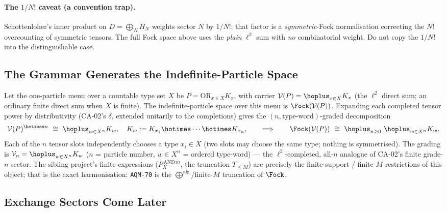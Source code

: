 \paragraph{The $1/N!$ caveat (a convention trap).}
Schottenloher's inner product on $D=\bigoplus_N H_N$ weights sector $N$ by $1/N!$;
that factor is a \emph{symmetric}-Fock normalisation correcting the $N!$
overcounting of symmetric tensors. The full Fock space above uses the \emph{plain}
$\ell^2$ sum with \emph{no} combinatorial weight. Do not copy the $1/N!$ into the
distinguishable case.

\subsection{The Grammar Generates the Indefinite-Particle Space}

Let the one-particle menu over a countable type set $X$ be
$P=\mathrm{OR}_{x\in X}K_x$, with carrier $\mathcal V(P)=\hoplus_{x\in X}K_x$ (the
$\ell^2$ direct sum; an ordinary finite direct sum when $X$ is finite). The
indefinite-particle space over this menu is $\Fock(\mathcal V(P))$. Expanding each completed tensor power by distributivity
(CA-02's $\delta$, extended unitarily to the completions) gives the
$(n,\text{type-word})$-graded decomposition
\[
  \mathcal V(P)^{\hotimes n}\ \cong\ \hoplus_{w\in X^n} K_w,
  \quad K_w:=K_{x_1}\hotimes\cdots\hotimes K_{x_n},
  \qquad\Longrightarrow\qquad
  \Fock(\mathcal V(P))\ \cong\ \hoplus_{n\ge 0}\ \hoplus_{w\in X^n} K_w .
\]
Each of the $n$ tensor slots independently chooses a type $x_i\in X$ (two slots may
choose the same type; nothing is symmetrised). The grading is $\mathcal V_n=\hoplus_{w\in X^n}K_w$ ($n$ = particle number, $w\in X^n$ = ordered type-word) ---
the $\ell^2$-completed, all-$n$ analogue of CA-02's finite grade-$n$ sector. The
sibling project's finite expressions ($P_X^{\,\mathrm{AND}\,m}$, the truncation
$T_{\le M}$) are precisely the finite-support / finite-$M$ restrictions of this
object; that is the exact harmonisation: \texttt{AQM-70} is the
$\bigoplus^{\mathrm{alg}}$/finite-$M$ truncation of $\Fock$.

\subsection{Exchange Sectors Come Later}

